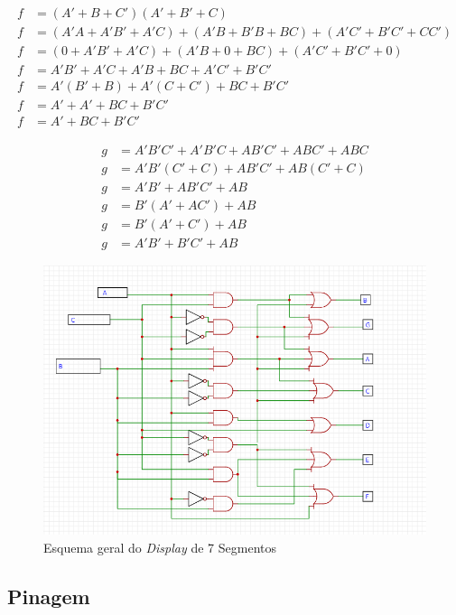 \documentclass[
	article,			%
	11pt,				%
	oneside,			%
	a4paper,			%
	english,			%
	brazil,				%
	sumario=tradicional
	]{abntex2}
\begin{document}
\begin{equation}
\begin{split}
f &= (A' + B + C')(A' + B' + C)\\
f &= (A'A + A'B' + A'C) + (A'B + B'B + BC) + (A'C' + B'C' + CC')\\
f &= (0 + A'B' + A'C) + (A'B + 0 + BC) + (A'C' + B'C' + 0)\\
f &= A'B' + A'C + A'B + BC + A'C' + B'C'\\
f &= A'(B' + B) + A'(C + C') + BC + B'C'\\
f &= A' + A' + BC + B'C'\\
f &= A' + BC + B'C'
\label{math:display-f}
\end{split}
\end{equation}

\begin{equation}
\begin{split}
g &= A'B'C' + A'B'C + AB'C' + ABC' + ABC\\
g &= A'B'(C' + C) + AB'C' + AB(C' + C)\\
g &= A'B' + AB'C' + AB\\
g &= B'(A' + AC') + AB\\
g &= B'(A' + C') + AB\\
g &= A'B' + B'C' + AB
\label{math:display-g}
\end{split}
\end{equation}

\begin{figure}[H]
    \centering
    \includegraphics[width=0.75\linewidth]{display.png}
    \caption{Esquema geral do \textit{Display} de 7 Segmentos}
    \label{fig:display}
\end{figure}

\subsection{Pinagem}
\end{document}
